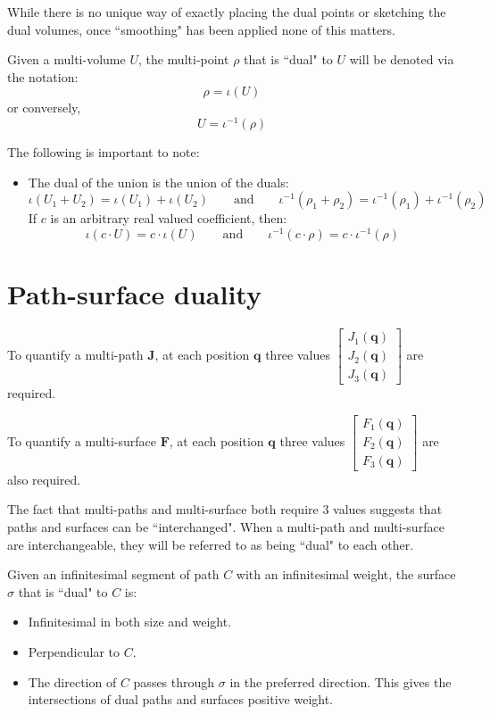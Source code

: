 While there is no unique way of exactly placing the dual points or sketching the dual volumes, once ``smoothing" has been applied none of this matters.

Given a multi-volume \(U\), the multi-point \(\rho\) that is ``dual" to \(U\) will be denoted via the notation:
\[\rho = \iota(U)\]
or conversely, 
\[U = \iota^{-1}(\rho)\]

The following is important to note:
\begin{itemize}
\item The dual of the union is the union of the duals:
\[\iota(U_1 + U_2) = \iota(U_1) + \iota(U_2)
\quad\quad\text{and}\quad\quad
\iota^{-1}(\rho_1 + \rho_2) = \iota^{-1}(\rho_1) + \iota^{-1}(\rho_2)\]
If \(c\) is an arbitrary real valued coefficient, then:
\[\iota(c \cdot U) = c \cdot \iota(U)
\quad\quad\text{and}\quad\quad
\iota^{-1}(c \cdot \rho) = c \cdot \iota^{-1}(\rho)\]
\end{itemize}




\section{Path-surface duality}

To quantify a multi-path \(\mathbf{J}\), at each position \(\mathbf{q}\) three values \(\begin{bmatrix} J_1(\mathbf{q}) \\ J_2(\mathbf{q}) \\ J_3(\mathbf{q}) \end{bmatrix}\) are required. 

To quantify a multi-surface \(\mathbf{F}\), at each position \(\mathbf{q}\) three values \(\begin{bmatrix} F_1(\mathbf{q}) \\ F_2(\mathbf{q}) \\ F_3(\mathbf{q}) \end{bmatrix}\) are also required. 

The fact that multi-paths and multi-surface both require 3 values suggests that paths and surfaces can be ``interchanged". When a multi-path and multi-surface are interchangeable, they will be referred to as being ``dual" to each other.

Given an infinitesimal segment of path \(C\) with an infinitesimal weight, the surface \(\sigma\) that is ``dual" to \(C\) is: 
\begin{itemize}
\item Infinitesimal in both size and weight.
\item Perpendicular to \(C\). 
\item The direction of \(C\) passes through \(\sigma\) in the preferred direction. This gives the intersections of dual paths and surfaces positive weight. 
\end{itemize}

